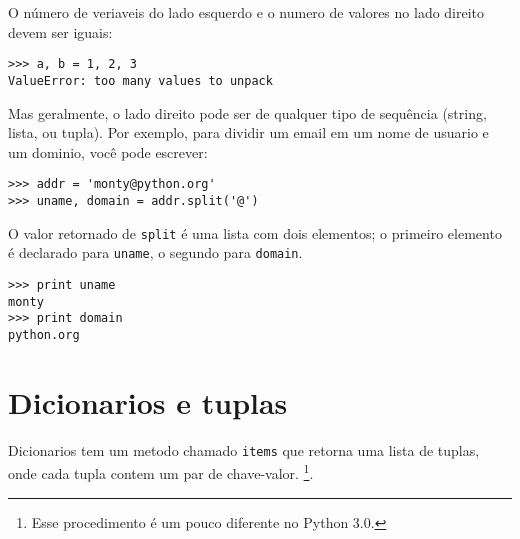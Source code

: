 O número de veriaveis do lado esquerdo e o numero de valores
no lado direito devem ser iguais:


\beforeverb
\begin{verbatim}
>>> a, b = 1, 2, 3
ValueError: too many values to unpack
\end{verbatim}
\afterverb
%
Mas geralmente, o lado direito pode ser de qualquer tipo de sequência
(string, lista, ou tupla). Por exemplo, para dividir um email em
um nome de usuario e um dominio, você pode escrever:


\beforeverb
\begin{verbatim}
>>> addr = 'monty@python.org'
>>> uname, domain = addr.split('@')
\end{verbatim}
\afterverb
%
O valor retornado de {\tt split} é uma lista com dois elementos;
o primeiro elemento é declarado para {\tt uname}, o segundo para
{\tt domain}.

\beforeverb
\begin{verbatim}
>>> print uname
monty
>>> print domain
python.org
\end{verbatim}
\afterverb
%

\section{Dicionarios e tuplas}


Dicionarios tem um metodo chamado {\tt items} que retorna uma lista de
tuplas, onde cada tupla contem um par de chave-valor.
\footnote{Esse procedimento é um pouco diferente no Python 3.0.}.


